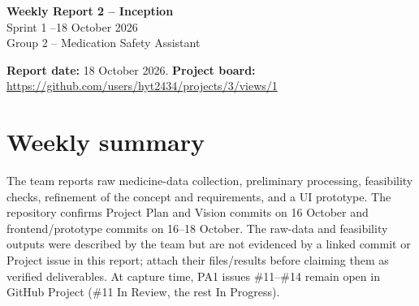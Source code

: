 

\begin{center}
{\Large\bfseries Weekly Report 2 -- Inception}\\[3pt]
Sprint 1 --18 October 2026\\
Group 2 -- Medication Safety Assistant
\end{center}
\textbf{Report date:} 18 October 2026. \textbf{Project board:} \url{https://github.com/users/hyt2434/projects/3/views/1}

\section{Weekly summary}
The team reports raw medicine-data collection, preliminary processing, feasibility checks, refinement of the concept and requirements, and a UI prototype. The repository confirms Project Plan and Vision commits on 16 October and frontend/prototype commits on 16--18 October. The raw-data and feasibility outputs were described by the team but are not evidenced by a linked commit or Project issue in this report; attach their files/results before claiming them as verified deliverables. At capture time, PA1 issues \#11--\#14 remain open in GitHub Project (\#11 In Review, the rest In Progress).

